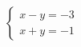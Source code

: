 $\displaystyle
\left\{
\begin{array}{l}
\displaystyle x - y = -3 \\
\displaystyle x + y = -1
\end{array}
\right.
$
